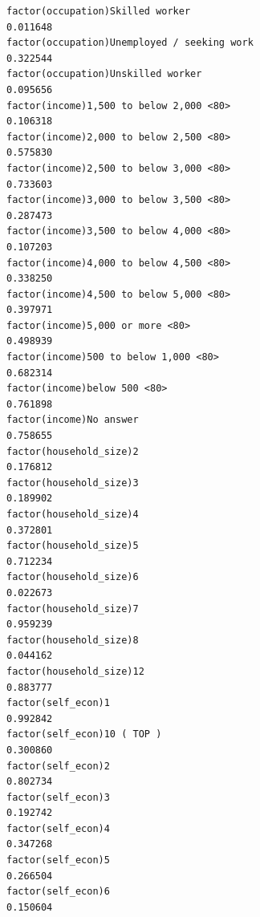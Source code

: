 \documentclass[
]{article}
\begin{document}
\begin{table}
\begin{minipage}[t]{\linewidth}
{\begin{verbatim}
factor(occupation)Skilled worker                                                  0.011648
factor(occupation)Unemployed / seeking work                                       0.322544
factor(occupation)Unskilled worker                                                0.095656
factor(income)1,500 to below 2,000 <80>                                           0.106318
factor(income)2,000 to below 2,500 <80>                                           0.575830
factor(income)2,500 to below 3,000 <80>                                           0.733603
factor(income)3,000 to below 3,500 <80>                                           0.287473
factor(income)3,500 to below 4,000 <80>                                           0.107203
factor(income)4,000 to below 4,500 <80>                                           0.338250
factor(income)4,500 to below 5,000 <80>                                           0.397971
factor(income)5,000 or more <80>                                                  0.498939
factor(income)500 to below 1,000 <80>                                             0.682314
factor(income)below 500 <80>                                                      0.761898
factor(income)No answer                                                           0.758655
factor(household_size)2                                                           0.176812
factor(household_size)3                                                           0.189902
factor(household_size)4                                                           0.372801
factor(household_size)5                                                           0.712234
factor(household_size)6                                                           0.022673
factor(household_size)7                                                           0.959239
factor(household_size)8                                                           0.044162
factor(household_size)12                                                          0.883777
factor(self_econ)1                                                                0.992842
factor(self_econ)10 ( TOP )                                                       0.300860
factor(self_econ)2                                                                0.802734
factor(self_econ)3                                                                0.192742
factor(self_econ)4                                                                0.347268
factor(self_econ)5                                                                0.266504
factor(self_econ)6                                                                0.150604

\end{verbatim}}
\end{minipage}
\end{table}
\end{document}
